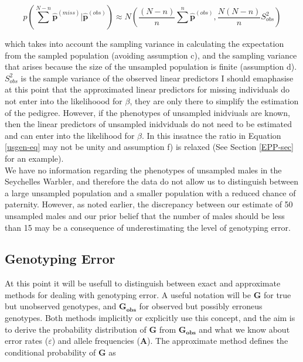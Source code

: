 \documentclass{article}
\begin{document}
\begin{equation}
p(\sum^{N-n}{\bm{\hat{p}}^{(miss)}} | \bm{\hat{p}}^{(obs)}) \approx N(\frac{(N-n)}{n}\sum^{n}\bm{\hat{p}}^{(obs)}, \frac{N(N-n)}{n}S_{obs}^{2})
\end{equation}

which takes into account the sampling variance in calculating the expectation from the sampled population (avoiding assumption c), and the sampling variance that arises because the size of the unsampled population is finite (assumption d). $S_{obs}^{2}$ is the sample variance of the observed linear predictors \citep[see][Chapter 7]{Gelman.2004}   I should emaphasise at this point that the approximated linear predictors for missing individuals do not enter into the likelihoood for $\beta$, they are only there to simplify the estimation of the pedigree.  However, if the phenotypes of unsampled inidviuals are known, then the linear predictors of unsampled inidviduals do not need to be estimated and can enter into the likelihood for $\beta$.  In  this insatnce the ratio in Equation \ref{usgen-eq} may not be unity and assumption f) is relaxed (See Section \ref{EPP-sec} for an example).\\

We have no information regarding the phenotypes of unsampled males in the Seychelles Warbler, and therefore the data do not allow us to distinguish between a large unsampled population and a smaller population with a reduced chance of paternity.  However, as noted earlier, the discrepancy between our estimate of 50 unsampled males and our prior belief that the number of males should be less than 15 may be a consequence of underestimating the level of genotyping error.

\subsection{Genotyping Error}
\label{GE-sec}

At this point it will be usefull to distinguish between exact and approximate methods for dealing with genotyping error.  A useful notation will be $\bm{G}$ for true but unobserved genotypes, and $\bm{G_{obs}}$ for observed but possibly erroneus genotypes.  Both methods implicitly or explicitly use this concept, and the aim is to derive the probability distribution of $\bm{G}$ from $\bm{G_{obs}}$ and what we know about error rates ($\varepsilon$) and allele frequencies ($\bm{A}$).  The approximate method defines the conditional probability of $\bm{G}$ as
\end{document}
